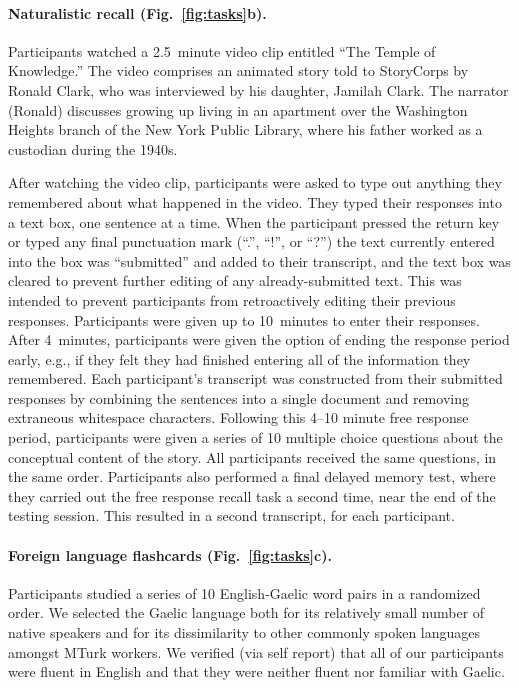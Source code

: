 \documentclass[10pt]{article}
\begin{document}
\paragraph*{Naturalistic recall (Fig.~\ref{fig:tasks}b).}
Participants watched a 2.5~minute video clip entitled ``The Temple of
Knowledge.''  The video comprises an animated story told to StoryCorps
by Ronald Clark, who was interviewed by his daughter, Jamilah Clark.
The narrator (Ronald) discusses growing up living in an apartment over
the Washington Heights branch of the New York Public Library, where his
father worked as a custodian during the 1940s.

After watching the video clip, participants were asked to type out
anything they remembered about what happened in the video.  They typed
their responses into a text box, one sentence at a time.  When the
participant pressed the return key or typed any final punctuation mark
(``.'', ``!'', or ``?'') the text currently entered into the box was
``submitted'' and added to their transcript, and the text box was
cleared to prevent further editing of any already-submitted text.
This was intended to prevent participants from retroactively editing
their previous responses.  Participants were given up to 10~minutes to
enter their responses.  After 4~minutes, participants were given the
option of ending the response period early, e.g., if they felt they
had finished entering all of the information they remembered.  Each
participant's transcript was constructed from their submitted
responses by combining the sentences into a single document and
removing extraneous whitespace characters.  Following this 4--10
minute free response period, participants were given a series of 10
multiple choice questions about the conceptual content of the story.
All participants received the same questions, in the same order.
Participants also performed a final delayed memory test, where they
carried out the free response recall task a second time, near the end
of the testing session.  This resulted in a second transcript, for
each participant.

\paragraph*{Foreign language flashcards (Fig.~\ref{fig:tasks}c).}
Participants studied a series of 10 English-Gaelic word pairs in a
randomized order.  We selected the Gaelic language both for its
relatively small number of native speakers and for its dissimilarity
to other commonly spoken languages amongst MTurk workers.
We verified (via self report) that all of our participants were fluent
in English and that they were neither fluent nor familiar with Gaelic.
\end{document}
